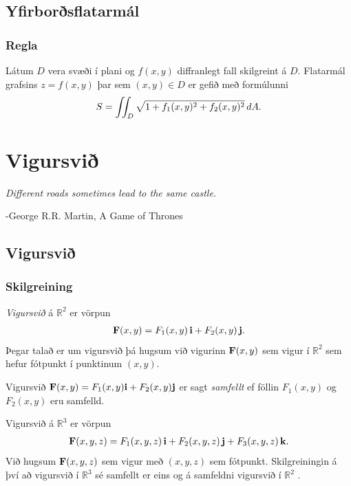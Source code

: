 \documentclass[a4paper,10pt,icelandic]{sphinxmanual}
\begin{document}
\section{Yfirborðsflatarmál}
\label{Kafli4:yfirborsflatarmal}

\subsection{Regla}
\label{Kafli4:id25}
Látum \(D\) vera svæði í plani og \(f(x,y)\) diffranlegt fall
skilgreint á \(D\). Flatarmál grafsins \(z=f(x,y)\) þar sem
\((x,y)\in D\) er gefið með formúlunni
\begin{gather}
\begin{split}\displaystyle S=\int\!\!\!\int_D \sqrt{1+f_1(x,y)^2+f_2(x,y)^2}\,dA.\end{split}\notag
\end{gather}

\chapter{Vigursvið}
\label{Kafli5::doc}\label{Kafli5:vigursvi}
\emph{Different roads sometimes lead to the same castle.}

-George R.R. Martin, A Game of Thrones


\section{Vigursvið}
\label{Kafli5:id1}

\subsection{Skilgreining}
\label{Kafli5:skilgreining}
\emph{Vigursvið} á \({\mathbb  R}^2\) er vörpun
\begin{gather}
\begin{split}\displaystyle \mbox{${\bf F}$}(x,y)=F_1(x,y)\,\mbox{${\bf i}$}+F_2(x,y)\,\mbox{${\bf j}$}.\end{split}\notag
\end{gather}
Þegar talað er um vigursvið þá hugsum við vigurinn
\(\mbox{${\bf F}$}(x,y)\) sem vigur í \({\mathbb  R}^2\) sem
hefur fótpunkt í punktinum \((x,y)\).

Vigursvið
\(\mbox{${\bf F}$}(x,y)=F_1(x,y)\mbox{${\bf i}$}+F_2(x,y)\mbox{${\bf j}$}\)
er sagt \emph{samfellt} ef föllin \(F_1(x,y)\) og \(F_2(x,y)\) eru
samfelld.

Vigursvið á \({\mathbb  R}^3\) er vörpun
\begin{gather}
\begin{split}\displaystyle \mbox{${\bf F}$}(x,y,z)=F_1(x,y,z)\,\mbox{${\bf i}$}+F_2(x,y,z)\,\mbox{${\bf j}$}+F_3(x,y,z)\,\mbox{${\bf k}$}.\end{split}\notag
\end{gather}
Við hugsum \(\mbox{${\bf F}$}(x,y,z)\) sem vigur með \((x,y,z)\)
sem fótpunkt. Skilgreiningin á því að vigursvið í \({\mathbb  R}^3\)
sé samfellt er eins og á samfeldni vigursvið í \({\mathbb  R}^2\) .
\end{document}
